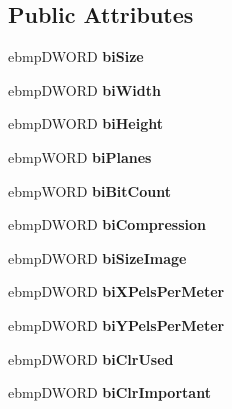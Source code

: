 \subsection*{Public Attributes}
\begin{DoxyCompactItemize}
\item 
\hypertarget{class_b_m_i_h_a2db3ef93c59706bc0fa570969a1b977d}{ebmp\-D\-W\-O\-R\-D {\bfseries bi\-Size}}\label{class_b_m_i_h_a2db3ef93c59706bc0fa570969a1b977d}

\item 
\hypertarget{class_b_m_i_h_ad0c7404fbebd92bfb2a7d6d9465779c8}{ebmp\-D\-W\-O\-R\-D {\bfseries bi\-Width}}\label{class_b_m_i_h_ad0c7404fbebd92bfb2a7d6d9465779c8}

\item 
\hypertarget{class_b_m_i_h_aa8e0f59fede14cd0d8fa5c4b5f24e6b0}{ebmp\-D\-W\-O\-R\-D {\bfseries bi\-Height}}\label{class_b_m_i_h_aa8e0f59fede14cd0d8fa5c4b5f24e6b0}

\item 
\hypertarget{class_b_m_i_h_a85822751ad3c5761aa722da52a3e8fc7}{ebmp\-W\-O\-R\-D {\bfseries bi\-Planes}}\label{class_b_m_i_h_a85822751ad3c5761aa722da52a3e8fc7}

\item 
\hypertarget{class_b_m_i_h_a483836ab0ab74bbbadc3aaaefb3bc6ff}{ebmp\-W\-O\-R\-D {\bfseries bi\-Bit\-Count}}\label{class_b_m_i_h_a483836ab0ab74bbbadc3aaaefb3bc6ff}

\item 
\hypertarget{class_b_m_i_h_ae8082e74c08c30be9ece489b51989a36}{ebmp\-D\-W\-O\-R\-D {\bfseries bi\-Compression}}\label{class_b_m_i_h_ae8082e74c08c30be9ece489b51989a36}

\item 
\hypertarget{class_b_m_i_h_ada57ca087ba23b0bfafcf161343f45b5}{ebmp\-D\-W\-O\-R\-D {\bfseries bi\-Size\-Image}}\label{class_b_m_i_h_ada57ca087ba23b0bfafcf161343f45b5}

\item 
\hypertarget{class_b_m_i_h_a3def1dbb5bdf27a3c9b36cd27228aa2e}{ebmp\-D\-W\-O\-R\-D {\bfseries bi\-X\-Pels\-Per\-Meter}}\label{class_b_m_i_h_a3def1dbb5bdf27a3c9b36cd27228aa2e}

\item 
\hypertarget{class_b_m_i_h_a933d1de74ec3e28cad20e83ca5751319}{ebmp\-D\-W\-O\-R\-D {\bfseries bi\-Y\-Pels\-Per\-Meter}}\label{class_b_m_i_h_a933d1de74ec3e28cad20e83ca5751319}

\item 
\hypertarget{class_b_m_i_h_a92a19ff093c553a393d53d0a3bd6c5e7}{ebmp\-D\-W\-O\-R\-D {\bfseries bi\-Clr\-Used}}\label{class_b_m_i_h_a92a19ff093c553a393d53d0a3bd6c5e7}

\item 
\hypertarget{class_b_m_i_h_ab36b35be2c0a89f215049baa7f46efb3}{ebmp\-D\-W\-O\-R\-D {\bfseries bi\-Clr\-Important}}\label{class_b_m_i_h_ab36b35be2c0a89f215049baa7f46efb3}

\end{DoxyCompactItemize}


